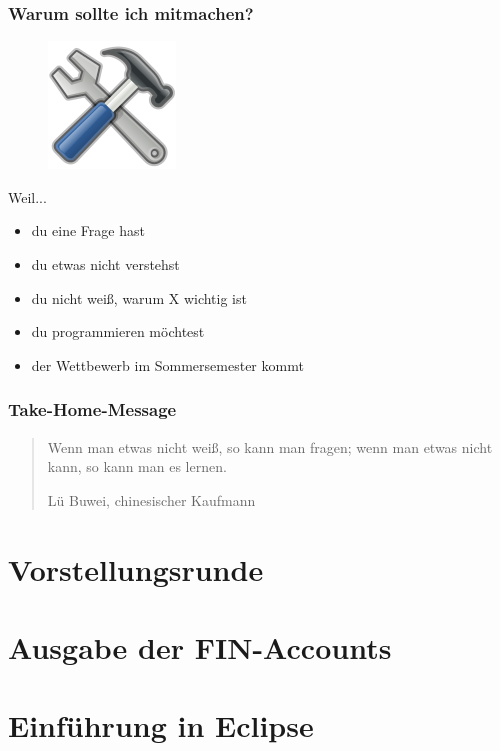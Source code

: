 \documentclass[12pt]{beamer}
\begin{document}
\begin{frame}

	\frametitle{Warum sollte ich mitmachen?}

	\begin{figure}
		\includegraphics[scale=0.55555]{src/img/tools}
	\end{figure}


	Weil...
	\pause
	\begin{itemize}
		\item du eine Frage hast
		\pause
		\item du etwas nicht verstehst
		\pause
		\item du nicht weiß, warum X wichtig ist
		\pause
		\item du programmieren möchtest
		\pause
		\item der Wettbewerb im Sommersemester kommt
	\end{itemize}

\end{frame}

\begin{frame}
	\frametitle{Take-Home-Message}
	\begin{quote}
		Wenn man etwas nicht weiß, so kann man fragen; wenn man etwas nicht
		kann, so kann man es lernen.
		\newline
		\begin{flushright}
		\scriptsize Lü Buwei, chinesischer Kaufmann
		\end{flushright}
	\end{quote}

\end{frame}

\section{Vorstellungsrunde}
\section{Ausgabe der FIN-Accounts}
\section{Einführung in Eclipse}
\end{document}
